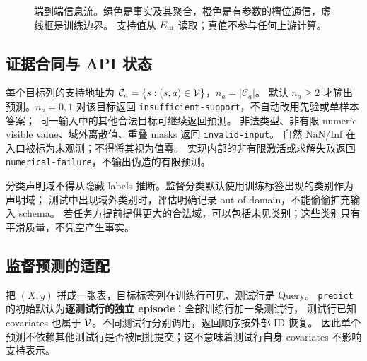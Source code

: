 \documentclass[11pt,UTF8,fontset=fandol]{ctexart}
\begin{document}
\begin{figure}[htbp]\centering
{}
\caption{端到端信息流。绿色是事实及其聚合，橙色是有参数的槽位通信，虚线框是训练边界。
支持值从 $E_{\rm in}$ 读取；真值不参与任何上游计算。}
\label{fig:flow}
\end{figure}

\subsection{证据合同与 API 状态}
每个目标列的支持地址为 $\mathcal C_a=\{s:(s,a)\in\mathcal V\}$，$n_a=|\mathcal C_a|$。
默认 $n_a\ge2$ 才输出预测。$n_a=0,1$ 对该目标返回 \texttt{insufficient-support}，不自动改用先验或单样本答案；
同一输入中的其他合法目标可继续返回预测。
非法类型、非有限 numeric visible value、域外离散值、重叠 masks 返回 \texttt{invalid-input}。
自然 NaN/Inf 在入口被标为未观测；不得将其视为值零。
实现内部的非有限激活或求解失败返回 \texttt{numerical-failure}，不输出伪造的有限预测。

分类声明域不得从隐藏 labels 推断。监督分类默认使用训练标签出现的类别作为声明域；
测试中出现域外类别时，评估明确记录 out-of-domain，不能偷偷扩充输入 schema。
若任务方提前提供更大的合法域，可以包括未见类别；这些类别只有平滑质量，不凭空产生事实。

\subsection{监督预测的适配}
把 $(X,y)$ 拼成一张表，目标标签列在训练行可见、测试行是 Query。
\texttt{predict} 的初始默认为\textbf{逐测试行的独立 episode}：全部训练行加一条测试行，
测试行已知 covariates 也属于 $\mathcal V$。不同测试行分别调用，返回顺序按外部 ID 恢复。
因此单个预测不依赖其他测试行是否被同批提交；这不意味着测试行自身 covariates 不影响支持表示。
\end{document}
